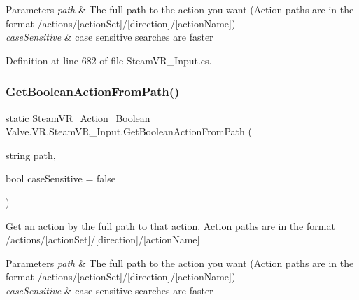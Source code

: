\begin{DoxyParams}{Parameters}
{\em path} & The full path to the action you want (Action paths are in the format /actions/\mbox{[}action\+Set\mbox{]}/\mbox{[}direction\mbox{]}/\mbox{[}action\+Name\mbox{]})\\
\hline
{\em case\+Sensitive} & case sensitive searches are faster\\
\hline
\end{DoxyParams}


Definition at line 682 of file Steam\+V\+R\+\_\+\+Input.\+cs.

\mbox{\label{class_valve_1_1_v_r_1_1_steam_v_r___input_a98161a36c23334e4f8d303d02bc757aa}} 
\subsubsection{\texorpdfstring{GetBooleanActionFromPath()}{GetBooleanActionFromPath()}}
{\footnotesize\ttfamily static \mbox{\hyperlink{class_valve_1_1_v_r_1_1_steam_v_r___action___boolean}{Steam\+V\+R\+\_\+\+Action\+\_\+\+Boolean}} Valve.\+V\+R.\+Steam\+V\+R\+\_\+\+Input.\+Get\+Boolean\+Action\+From\+Path (\begin{DoxyParamCaption}\item[{string}]{path,  }\item[{bool}]{case\+Sensitive = {\ttfamily false} }\end{DoxyParamCaption})\hspace{0.3cm}{\ttfamily [static]}}



Get an action by the full path to that action. Action paths are in the format /actions/\mbox{[}action\+Set\mbox{]}/\mbox{[}direction\mbox{]}/\mbox{[}action\+Name\mbox{]} 


\begin{DoxyParams}{Parameters}
{\em path} & The full path to the action you want (Action paths are in the format /actions/\mbox{[}action\+Set\mbox{]}/\mbox{[}direction\mbox{]}/\mbox{[}action\+Name\mbox{]})\\
\hline
{\em case\+Sensitive} & case sensitive searches are faster\\
\hline
\end{DoxyParams}



